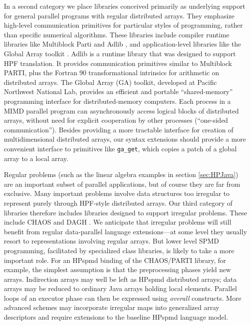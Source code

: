 In a second category we place libraries conceived primarily as
underlying support for general parallel programs with regular
distributed arrays.  They emphasize high-level communication primitives
for particular styles of programming, rather than specific numerical
algorithms.  These libraries include compiler runtime libraries like
Multiblock Parti \cite{structured} and Adlib \cite{PCRC_based}, and
application-level libraries like the Global Array toolkit
\cite{Global_Arrays}.  Adlib is a runtime library that was
designed to support HPF translation.  It provides communication
primitives similar to Multiblock PARTI, plus the Fortran 90
transformational intrinsics for arithmetic on distributed arrays.  The
Global Array (GA) toolkit, developed at Pacific Northwest National Lab,
provides an efficient and portable ``shared-memory'' programming
interface for distributed-memory computers.  Each process in a MIMD
parallel program can asynchronously access logical blocks of
distributed arrays, without need for explicit cooperation by other
processes (``one-sided communication'').  Besides providing a more
tractable interface for creation of multidimensional distributed
arrays, our syntax extensions should provide a more convenient
interface to primitives like {\tt ga\_get}, which copies a patch of
a global array to a local array.

Regular problems (such as the linear algebra examples in section
\ref{sec:HPJava}) are an important subset of parallel applications, but
of course they are far from exclusive.  Many important problems involve
data structures too irregular to represent purely through HPF-style
distributed arrays.  Our third category of libraries therefore includes
libraries designed to support irregular problems.  These include CHAOS
\cite{CHAOS} and DAGH \cite{HDDA_DAGH}.  We anticipate that
irregular problems will still benefit from regular data-parallel
language extensions---at some level they usually resort to
representations involving regular arrays.  But lower level SPMD
programming, facilitated by specialized class libraries, is likely to
take a more important role.  For an HPspmd binding of the CHAOS/PARTI library,
for example, the simplest assumption is that the preprocessing phases
yield new arrays.  Indirection arrays may well be left as HPspmd
distributed arrays; data arrays may be reduced to ordinary Java arrays
holding local elements.  Parallel loops of an executor phase can then
be expressed using {\em overall} constructs.  More advanced schemes may
incorporate irregular maps into generalized array descriptors
\cite{HPF2Standard,FortranD,ViennaFortran} and require extensions to
the baseline HPspmd language model.


